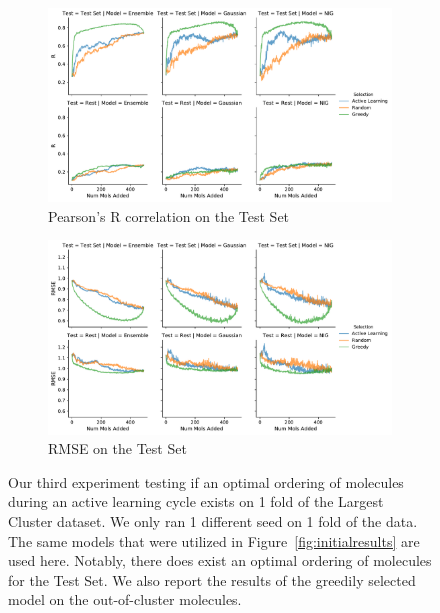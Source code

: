 \documentclass[journal=jmcmar,manuscript=article]{achemso}
\begin{document}
\begin{figure}[tbph]
    \centering
    \begin{subfigure}[b]{0.48\textwidth}
        \includegraphics[width=1\linewidth]{figures/fig4_lc_withgreed_R.pdf}
        \caption{Pearson's R correlation on the Test Set}
    \end{subfigure}%
    \hfill
    \begin{subfigure}[b]{0.48\textwidth}
        \includegraphics[width=1\linewidth]{figures/fig4_lc_withgreed_RMSE.pdf}
        \caption{RMSE on the Test Set}
    \end{subfigure}
    \caption{Our third experiment testing if an optimal ordering of molecules during an active learning cycle exists on 1 fold of the Largest Cluster dataset. We only ran 1 different seed on 1 fold of the data. The same models that were utilized in Figure~\ref{fig:initialresults} are used here. Notably, there does exist an optimal ordering of molecules for the Test Set. We also report the results of the greedily selected model on the out-of-cluster molecules.}
    \label{fig:lcgreed}
\end{figure}
\end{document}
